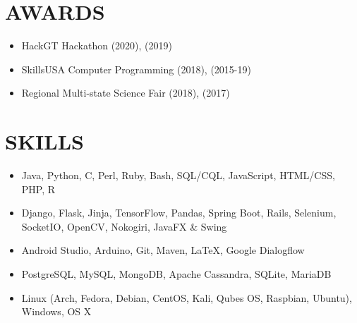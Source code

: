 \documentclass[11pt,letterpaper]{article}
\begin{document}
  
  \section*{AWARDS}

  \begin{itemize}
    \item{
      HackGT Hackathon \textemdash{}
      {}
      (2020),
      {}
      (2019)
    }



    \item{
      SkillsUSA Computer Programming
      \textemdash{}
      {}
      (2018),
      {}
      (2015-19)
    }

    \item{
      Regional Multi-state Science Fair
      \textemdash{}
      {}
      (2018),
      {}
      (2017)
    }
  \end{itemize}

  \bigskip


  \section*{SKILLS}

  \begin{itemize}
    \item{
      {}
      Java, Python, C, Perl, Ruby, Bash, SQL/CQL, JavaScript, HTML/CSS, PHP, R
    }

    \item{
      {}
      Django, Flask, Jinja, TensorFlow, Pandas, Spring Boot, Rails, Selenium, SocketIO, OpenCV, Nokogiri, JavaFX \& Swing
    }

    \item{
      {}
      Android Studio, Arduino, Git, Maven, \LaTeX, Google Dialogflow
    }

    \item{
      {}
      PostgreSQL, MySQL, MongoDB, Apache Cassandra, SQLite, MariaDB
    }

    \item{
      {}
      Linux (Arch, Fedora, Debian, CentOS, Kali, Qubes OS, Raspbian, Ubuntu), Windows, OS X
    }
  \end{itemize}
\end{document}
